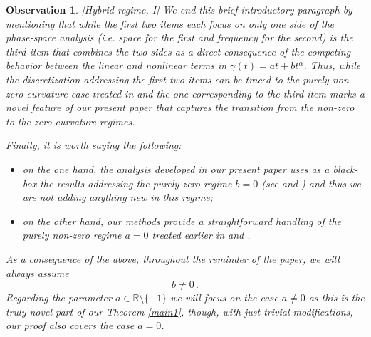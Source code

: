 \documentclass[a4paper,reqno]{amsart}
\numberwithin{equation}{section}
\newtheorem{observation}[theorem]{Observation}
\theoremstyle{definition}
\newcommand{\R}{\mathbb{R}}
\def\a{\alpha}
\def\g{\gamma}
\begin{document}
\begin{observation}\label{const}[\textsf{Hybrid regime}, I] We end this brief introductory paragraph by mentioning that while the first two items each focus on only one side of the phase-space analysis (\textit{i.e.} space for the first and frequency for the second) is the third item that combines the two sides as a direct consequence of the competing behavior between the linear and nonlinear terms in $\g(t)=at+bt^\a$. Thus, while the discretization addressing the first two items can be traced to the purely non-zero curvature case treated in \cite{Li13} and \cite{Lie15} the one corresponding to the third item marks a novel feature of our present paper that captures the transition from the non-zero to the zero curvature regimes.

Finally, it is worth saying the following:
\begin{itemize}
\item on the one hand, the analysis developed in our present paper uses as a black-box the results addressing the purely zero regime $b=0$ (see \cite{LT97} and \cite{LT99}) and thus we are not adding anything new in this regime;

\item on the other hand, our methods provide a straightforward handling of the purely non-zero regime $a=0$ treated earlier in \cite{Li13} and \cite{Lie15}.
\end{itemize}

As a consequence of the above, throughout the reminder of the paper, we will always assume
\begin{equation}\label{abnl}
		b\not=0\,.
	\end{equation}
Regarding the parameter $a\in\R\setminus\{-1\}$ we will focus on the case $a\not=0$ as this is the truly novel part of our Theorem \ref{main1}, though, with just trivial modifications, our proof also covers the case $a=0$.
\end{observation}
\end{document}
